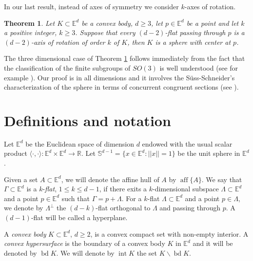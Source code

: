 \documentclass[12pt,thmsa]{amsart}
\newcommand{\Et}{\mathbb{E}^3}
\newcommand{\Ed}{\mathbb{E}^{d}}
\newcommand{\inte}{\operatorname*{int}}
\newcommand{\aff}{\operatorname*{aff}}
\newcommand{\bd}{\operatorname*{bd}}
\newtheorem{theorem}{Theorem}
\begin{document}
In our last result, instead of axes of symmetry we consider $k$-axes of rotation. 

\begin{theorem}\label{brasil}
Let $K\subset \Ed$ be a convex body, $d\geq 3$, let $p\in \Ed$ be a point and let $k$ a positive integer, $k\geq 3$. Su\-ppo\-se that every $(d-2)$-flat passing through $p$ is a $(d-2)$-axis of rotation of order 
$k$ of $K$, then $K$ is a sphere with center at $p$.
\end{theorem}






The three dimensional case of Theorem \ref{brasil} follows immediately from the fact that the classification of the finite subgroups of $SO(3)$ is well understood %
(see for example  \cite[ Thm. 19.2]{arm}). Our proof is in all dimensions and it involves the S\"uss-Schneider's cha\-rac\-te\-ri\-za\-tion of the sphere in terms of concurrent congruent sections (see \cite{schneider, suss}). 



 \section{Definitions and notation}\label{defs}



 Let $\mathbb{E}^{d}$ be the Euclidean space of dimension $d$ endowed with the usual scalar product $\langle \cdot, \cdot\rangle : \mathbb{E}^{d} \times \mathbb{E}^{d} \rightarrow \mathbb{R}$. %
 Let $\mathbb{S}^{d-1}=\{x\in \mathbb{E}^{d}: ||x|| = 1\}$ be the unit sphere in $\mathbb{E}^{d}$.
 
 Given a set $A\subset \Ed$,  we will denote the affine hull of $A$ by $\aff\{A\}$. We say that $\Gamma\subset \Ed$  is a $k$-\textit{flat}, $1\leq k\leq d-1$, if there exits a $k$-dimensional subspace $\Lambda\subset \Ed$ and a point $p\in \Ed$ such that $\Gamma=p+\Lambda$. For a $k$-flat $\Lambda\subset \Ed$ and a point $p\in  \Lambda$, we denote by
$\Lambda ^\perp$ the $(d-k)$-flat orthogonal to $\Lambda$ and passing through $p$. A $(d-1)$-flat will be called a hyperplane.


A {\it convex body} $K\subset {\mathbb E^d}$, $d\ge 2$,   is a convex compact set with non-empty interior. A \textit{convex hypersurface} is the boundary of a convex body $K$ in $\Ed$ and it will be denoted by $\bd K$. We will denote by $\inte K$ the set $K\backslash \bd K$.
\end{document}
